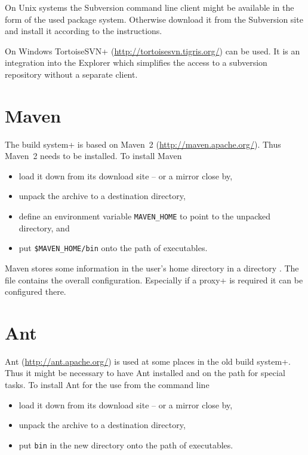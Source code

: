On Unix systems the Subversion command line client might be available
in the form of the used package system. Otherwise download it from the
Subversion site and install it according to the instructions.

On Windows \+TortoiseSVN+ (\url{http://tortoisesvn.tigris.org/}) can
be used. It is an integration into the Explorer which simplifies the
access to a subversion repository without a separate client.


\section{Maven}

The \+build system+ is based on Maven~2 (\url{http://maven.apache.org/}).
Thus Maven~2 needs to be installed. To install Maven 

\begin{itemize}
\item load it down from its download site -- or a mirror close by,
\item unpack the archive to a destination directory,
\item define an environment variable
  \texttt{MAVEN\_HOME} to
  point to the unpacked directory, and
\item put \texttt{\$MAVEN\_HOME/bin} onto the path of executables.
\end{itemize}

Maven stores some information in the user's home directory in a
directory . The file  contains the overall
configuration. Especially if a \+proxy+ is required it can be
configured there.


\section{Ant}

Ant (\url{http://ant.apache.org/}) is used at some places in the old
\+build system+. Thus it might be necessary to have Ant installed and
on the path for special tasks. To install Ant for the use from the
command line

\begin{itemize}
\item load it down from its download site -- or a mirror close by,
\item unpack the archive to a destination directory,
\item put \texttt{bin} in the new directory onto the path of
  executables.
\end{itemize}


